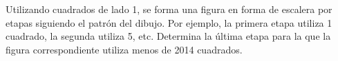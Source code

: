 Utilizando cuadrados de lado 1, se forma una figura en forma de escalera por etapas siguiendo el patrón del dibujo. 
Por ejemplo, la primera etapa utiliza 1 cuadrado, la segunda utiliza 5, etc. Determina la última etapa para la que la figura correspondiente utiliza menos de 2014 cuadrados.
